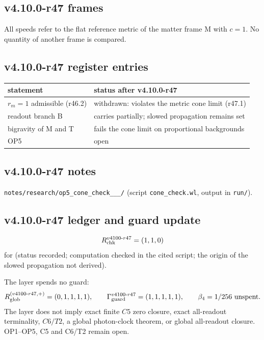 \subsection*{v4.10.0-r47 frames}
\label{subsec:v4100-r47-frames}

All speeds refer to the flat reference metric of the matter frame M with \(c=1\).  No quantity of another frame is compared.

\subsection*{v4.10.0-r47 register entries}
\label{subsec:v4100-r47-register}

\begin{center}
\small
\begin{tabular}{@{}>{\raggedright\arraybackslash}p{}>{\raggedright\arraybackslash}p{}@{}}
\toprule
statement & status after v4.10.0-r47\\
\midrule
\(r_m=1\) admissible (r46.2) & withdrawn: violates the metric cone limit (r47.1)\\
readout branch B & carries partially; slowed propagation remains set\\
bigravity of M and T & fails the cone limit on proportional backgrounds\\
OP5 & open\\
\bottomrule
\end{tabular}
\end{center}

\subsection*{v4.10.0-r47 notes}
\label{subsec:v4100-r47-notes}

\texttt{notes/\allowbreak research/\allowbreak op5\_\allowbreak cone\_\allowbreak check\_\_\_/} (script \texttt{cone\_\allowbreak check.wl}, output in \texttt{run/}).

\subsection*{v4.10.0-r47 ledger and guard update}
\label{subsec:v4100-r47-ledger-guard}

\[
R_{\rm chk}^{v4100\text{-}r47}=(1,1,0)
\]
for (status recorded; computation checked in the cited script; the origin of the slowed propagation not derived).

The layer spends no guard:
\[
R_{\rm glob}^{(v4100\text{-}r47,+)}=(0,1,1,1,1),
\qquad
\Gamma_{\rm guard}^{v4100\text{-}r47}=(1,1,1,1,1),
\qquad
\beta_4=1/256\ \text{unspent}.
\]
The layer does not imply exact finite \(C5\) zero closure, exact all-readout terminality, \(C6/T2\), a global photon-clock theorem,
or global all-readout closure.  OP1--OP5, C5 and C6/T2 remain open.

